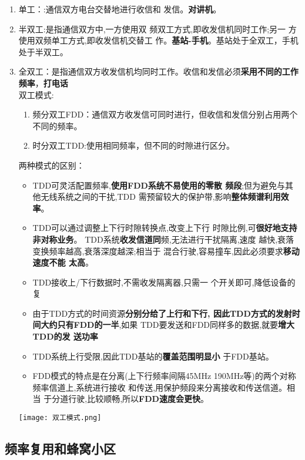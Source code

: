 	\begin{enumerate}
		\item 单工：:通信双方电台交替地进行收信和
		发信。\textbf{对讲机}。
		\item 半双工:是指通信双方中,一方使用双 
		频双工方式,即收发信机同时工作;另一
		方使用双频单工方式,即收发信机交替工
		作。\textbf{基站-手机}。基站处于全双工，手机处于半双工。
		\item 全双工：是指通信双方收发信机均同时工作。收信和发信必须\textbf{采用不同的工作频率}，\textbf{打电话}	\\
		双工模式:
		\begin{enumerate}
		\item 频分双工FDD：通信双方收发信可同时进行，但收信和发信分别占用两个不同的频率。
		\item 时分双工TDD:使用相同频率，但不同的时隙进行区分。
		\end{enumerate}
		两种模式的区别：
		
		\begin{itemize}
			\item TDD可灵活配置频率,\textbf{使用FDD系统不易使用的零散
			频段};但为避免与其他无线系统之间的干扰,TDD
			需预留较大的保护带,影响\textbf{整体频谱利用效率}。
			\item TDD可以通过调整上下行时隙转换点,改变上下行
			时隙比例,可\textbf{很好地支持非对称业务}。
			TDD系统\textbf{收发信道同}频,无法进行干扰隔离,速度
			越快,衰落变换频率越高,衰落深度越深;相当于
			混合行驶,容易撞车,因此必须要求\textbf{移动速度不能
			太高}。
			\item TDD接收上/下行数据时,不需收发隔离器,只需一
			个开关即可,降低设备的复
			\item 由于TDD方式的时间资源\textbf{分别分给了上行和下行,
			因此TDD方式的发射时间大约只有FDD的一半},如果
			TDD要发送和FDD同样多的数据,就要\textbf{增大TDD的发
			送功率}
			\item TDD系统上行受限,因此TDD基站的\textbf{覆盖范围明显小}
			于FDD基站。
			\item FDD模式的特点是在分离(上下行频率间隔45MHz
			190MHz等)的两个对称频率信道上,系统进行接收
			和传送,用保护频段来分离接收和传送信道。相当
			于分道行驶,比较顺畅,所以\textbf{FDD速度会更快}。
		\end{itemize}
	
		\begin{center}
			\texttt{[image: 双工模式.png]}
		\end{center}
	\end{enumerate}
	\subsection{频率复用和蜂窝小区}

